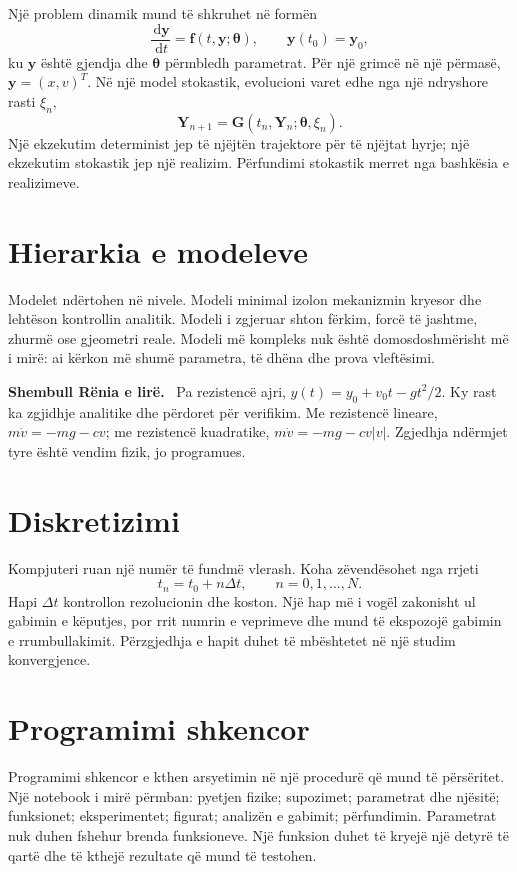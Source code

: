\documentclass[11pt,oneside,openany]{book}
\newcommand{\vect}[1]{\bm{#1}}
\newcommand{\dd}{\,\mathrm{d}}
\newenvironment{shembull}[1][]{\par\medskip\noindent\textbf{Shembull #1.}\ }{\par\medskip}
\begin{document}
Një problem dinamik mund të shkruhet në formën
\begin{equation}
 \frac{\dd \vect y}{\dd t}=\vect f(t,\vect y;\vect\theta),\qquad \vect y(t_0)=\vect y_0,
\end{equation}
ku $\vect y$ është gjendja dhe $\vect\theta$ përmbledh parametrat. Për një grimcë në një përmasë, $\vect y=(x,v)^T$. Në një model stokastik, evolucioni varet edhe nga një ndryshore rasti $\xi_n$,
\begin{equation}
 \vect Y_{n+1}=\vect G(t_n,\vect Y_n;\vect\theta,\xi_n).
\end{equation}
Një ekzekutim determinist jep të njëjtën trajektore për të njëjtat hyrje; një ekzekutim stokastik jep një realizim. Përfundimi stokastik merret nga bashkësia e realizimeve.

\section{Hierarkia e modeleve}
Modelet ndërtohen në nivele. Modeli minimal izolon mekanizmin kryesor dhe lehtëson kontrollin analitik. Modeli i zgjeruar shton fërkim, forcë të jashtme, zhurmë ose gjeometri reale. Modeli më kompleks nuk është domosdoshmërisht më i mirë: ai kërkon më shumë parametra, të dhëna dhe prova vleftësimi.

\begin{shembull}[Rënia e lirë]
Pa rezistencë ajri, $y(t)=y_0+v_0t-gt^2/2$. Ky rast ka zgjidhje analitike dhe përdoret për verifikim. Me rezistencë lineare, $m\dot v=-mg-cv$; me rezistencë kuadratike, $m\dot v=-mg-cv|v|$. Zgjedhja ndërmjet tyre është vendim fizik, jo programues.
\end{shembull}

\section{Diskretizimi}
Kompjuteri ruan një numër të fundmë vlerash. Koha zëvendësohet nga rrjeti
\begin{equation}
 t_n=t_0+n\Delta t,\qquad n=0,1,\ldots,N.
\end{equation}
Hapi $\Delta t$ kontrollon rezolucionin dhe koston. Një hap më i vogël zakonisht ul gabimin e këputjes, por rrit numrin e veprimeve dhe mund të ekspozojë gabimin e rrumbullakimit. Përzgjedhja e hapit duhet të mbështetet në një studim konvergjence.

\section{Programimi shkencor}
Programimi shkencor e kthen arsyetimin në një procedurë që mund të përsëritet. Një notebook i mirë përmban: pyetjen fizike; supozimet; parametrat dhe njësitë; funksionet; eksperimentet; figurat; analizën e gabimit; përfundimin. Parametrat nuk duhen fshehur brenda funksioneve. Një funksion duhet të kryejë një detyrë të qartë dhe të kthejë rezultate që mund të testohen.
\end{document}
